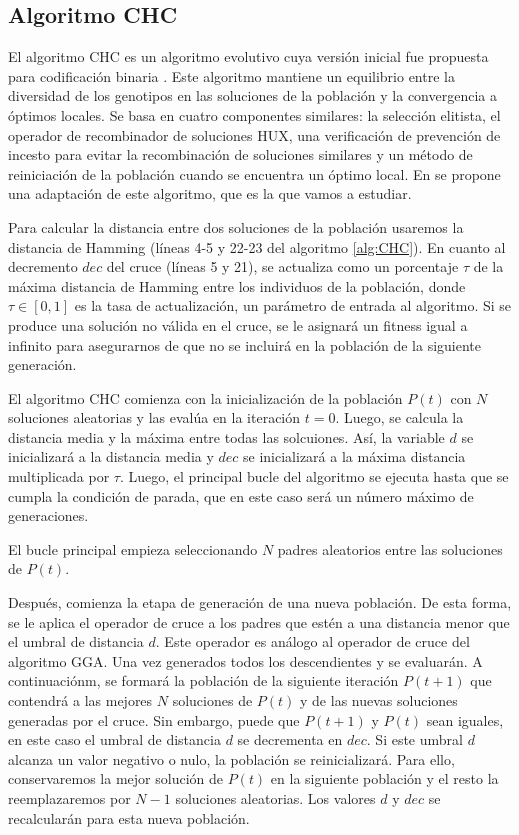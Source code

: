 \subsection{Algoritmo CHC}

El algoritmo CHC es un algoritmo evolutivo cuya versión inicial fue propuesta para codificación binaria \cite{CHC_1991}. Este algoritmo mantiene un equilibrio entre la diversidad de los genotipos en las soluciones de la población y la convergencia a óptimos locales. Se basa en cuatro componentes similares: la selección elitista, el operador de recombinador de soluciones HUX, una verificación de prevención de incesto para evitar la recombinación de soluciones similares y un método de reiniciación de la población cuando se encuentra un óptimo local. En \cite{Cuellar_etal} se propone una adaptación de este algoritmo, que es la que vamos a estudiar.

Para calcular la distancia entre dos soluciones de la población usaremos la distancia de Hamming (líneas 4-5 y 22-23 del algoritmo \ref{alg:CHC}). En cuanto al decremento $dec$ del cruce (líneas 5 y 21), se actualiza como un porcentaje $\tau$ de la máxima distancia de Hamming entre los individuos de la población, donde $\tau \in [0,1]$ es la tasa de actualización, un parámetro de entrada al algoritmo. Si se produce una solución no válida en el cruce, se le asignará un fitness igual a infinito para asegurarnos de que no se incluirá en la población de la siguiente generación.

El algoritmo CHC comienza con la inicialización de la población $P(t)$ con $N$ soluciones aleatorias y las evalúa en la iteración $t = 0$. Luego, se calcula la distancia media y la máxima entre todas las solcuiones. Así, la variable $d$ se inicializará a la distancia media y $dec$ se inicializará a la máxima distancia multiplicada por $\tau$. Luego, el principal bucle del algoritmo se ejecuta hasta que se cumpla la condición de parada, que en este caso será un número máximo de generaciones.

El bucle principal empieza seleccionando $N$ padres aleatorios entre las soluciones de $P(t)$.

Después, comienza la etapa de generación de una nueva población. De esta forma, se le aplica el operador de cruce a los padres que estén a una distancia menor que el umbral de distancia $d$. Este operador es análogo al operador de cruce del algoritmo GGA. Una vez generados todos los descendientes y se evaluarán. A continuaciónm, se formará la población de la siguiente iteración $P(t+1)$ que contendrá a las mejores $N$ soluciones de $P(t)$ y de las nuevas soluciones generadas por el cruce. Sin embargo, puede que $P(t+1)$ y $P(t)$ sean iguales, en este caso el umbral de distancia $d$ se decrementa en $dec$. Si este umbral $d$ alcanza un valor negativo o nulo, la población se reinicializará. Para ello, conservaremos la mejor solución de $P(t)$ en la siguiente población y el resto la reemplazaremos por $N-1$ soluciones aleatorias. Los valores $d$ y $dec$ se recalcularán para esta nueva población.

